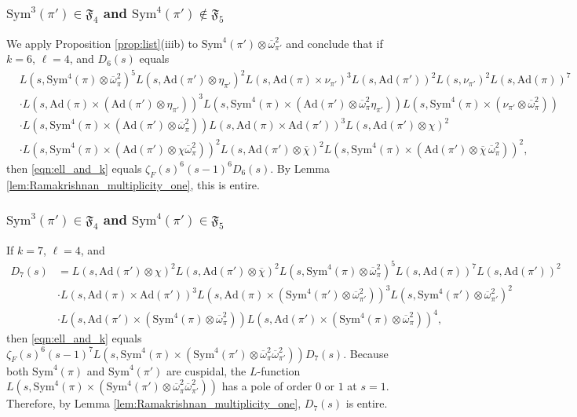 \documentclass[11pt]{amsart}
\theoremstyle{remark}
\numberwithin{equation}{section}
\begin{document}
\subsubsection{$\mathrm{Sym}^3(\pi')\in\mathfrak{F}_{4}$ and $\mathrm{Sym}^4(\pi')\notin\mathfrak{F}_{5}$}
We apply Proposition \ref{prop:list}(iiib) to $\mathrm{Sym}^4(\pi')\otimes\overline{\omega}_{\pi'}^{2}$ and conclude that if $k=6$, $\ell=4$, and $D_6(s)$ equals
\begin{align*}
&L(s,\mathrm{Sym}^4(\pi)\otimes\overline{\omega}_{\pi}^{2})^5 L(s,\mathrm{Ad}(\pi')\otimes\eta_{\pi'})^2  L(s,\mathrm{Ad}(\pi)\times \nu_{\pi'})^3 L(s,\mathrm{Ad}(\pi'))^2 L(s,\nu_{\pi'})^2 L(s,\mathrm{Ad}(\pi))^7\\
&\cdot L(s,\mathrm{Ad}(\pi)\times(\mathrm{Ad}(\pi')\otimes \eta_{\pi'}))^3   L(s,\mathrm{Sym}^4(\pi)\times(\mathrm{Ad}(\pi')\otimes\overline{\omega}_{\pi}^{2} \eta_{\pi'})) L(s,\mathrm{Sym}^4(\pi)\times(\nu_{\pi'}\otimes\overline{\omega}_{\pi}^{2}))\\
&\cdot L(s,\mathrm{Sym}^4(\pi)\times(\mathrm{Ad}(\pi')\otimes\overline{\omega}_{\pi}^{2})) L(s,\mathrm{Ad}(\pi)\times\mathrm{Ad}(\pi'))^3 L(s,\mathrm{Ad}(\pi')\otimes\chi)^2\\
&\cdot  L(s,\mathrm{Sym}^4(\pi)\times(\mathrm{Ad}(\pi')\otimes\chi\overline{\omega}_{\pi}^{2}))^2 L(s,\mathrm{Ad}(\pi')\otimes\overline{\chi})^2 L(s,\mathrm{Sym}^4(\pi)\times(\mathrm{Ad}(\pi')\otimes\overline{\chi}\,\overline{\omega}_{\pi}^{2}))^2,
\end{align*}
then \eqref{eqn:ell_and_k} equals $\zeta_F(s)^6 (s-1)^6  D_6(s)$.  By Lemma \ref{lem:Ramakrishnan_multiplicity_one}, this is entire.

\subsubsection{$\mathrm{Sym}^3(\pi')\in\mathfrak{F}_{4}$ and $\mathrm{Sym}^4(\pi')\in\mathfrak{F}_{5}$}
If $k=7$, $\ell=4$, and
\begin{align*}
D_7(s)&=L(s,\mathrm{Ad}(\pi')\otimes\chi)^2 L(s,\mathrm{Ad}(\pi')\otimes\overline{\chi})^2 L(s,\mathrm{Sym}^4(\pi)\otimes\overline{\omega}_{\pi}^{2})^5 L(s,\mathrm{Ad}(\pi))^7 L(s,\mathrm{Ad}(\pi'))^2\\
&\cdot L(s,\mathrm{Ad}(\pi)\times\mathrm{Ad}(\pi'))^3 L(s,\mathrm{Ad}(\pi)\times(\mathrm{Sym}^4(\pi')\otimes\overline{\omega}_{\pi'}^{2}))^3 L(s,\mathrm{Sym}^4(\pi')\otimes\overline{\omega}_{\pi'}^{2})^2\\
&\cdot L(s,\mathrm{Ad}(\pi')\times(\mathrm{Sym}^4(\pi)\otimes\overline{\omega}_{\pi}^{2})) L(s,\mathrm{Ad}(\pi')\times(\mathrm{Sym}^4(\pi)\otimes\overline{\omega}_{\pi}^{2}))^4,
\end{align*}
then \eqref{eqn:ell_and_k} equals $\zeta_F(s)^6 (s-1)^7 L(s,\mathrm{Sym}^4(\pi)\times(\mathrm{Sym}^4(\pi')\otimes\overline{\omega}_{\pi}^{2}\overline{\omega}_{\pi'}^{2})) D_7(s)$.  Because both $\mathrm{Sym}^4(\pi)$ and $\mathrm{Sym}^4(\pi')$ are cuspidal, the $L$-function $L(s,\mathrm{Sym}^4(\pi)\times(\mathrm{Sym}^4(\pi')\otimes\overline{\omega}_{\pi}^{2}\overline{\omega}_{\pi'}^{2}))$ has a pole of order $0$ or $1$ at $s=1$.  Therefore, by Lemma \ref{lem:Ramakrishnan_multiplicity_one}, $D_7(s)$ is entire.
\end{document}
